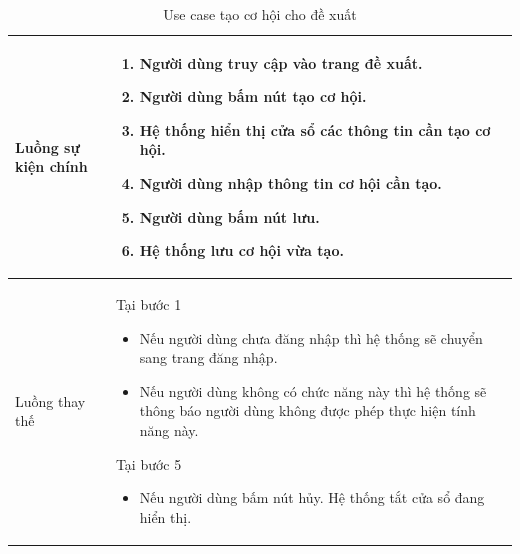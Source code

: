 \documentclass[12pt,a4paper]{article}
\begin{document}
\begin{table}[H]
\begin{tabular}{|p{3.5cm}|p{11.5cm}|c|}
            Luồng sự kiện chính & \vspace{-.8cm}\begin{enumerate}
                                                    \item Người dùng truy cập vào trang đề xuất.
                                                    \item Người dùng bấm nút tạo cơ hội.
                                                    \item Hệ thống hiển thị cửa sổ các thông tin cần tạo cơ hội.
                                                    \item Người dùng nhập thông tin cơ hội cần tạo.
                                                    \item Người dùng bấm nút lưu.
                                                    \item Hệ thống lưu cơ hội vừa tạo.
            \end{enumerate}
            \\
            \hline
            Luồng thay thế & Tại bước 1\newline
            \vspace{-.8cm}\begin{itemize}
                              \item Nếu người dùng chưa đăng nhập thì hệ thống sẽ chuyển sang trang đăng nhập.
                              \item Nếu người dùng không có chức năng này thì hệ thống sẽ thông báo người dùng không được phép thực hiện tính năng này.
            \end{itemize}
            Tại bước 5\newline
            \vspace{-.8cm}\begin{itemize}
                              \item Nếu người dùng bấm nút hủy. Hệ thống tắt cửa sổ đang hiển thị.
            \end{itemize}
            \\ \hline
        \end{tabular}
        \caption{Use case tạo cơ hội cho đề xuất}

    \end{table}

\end{document}
